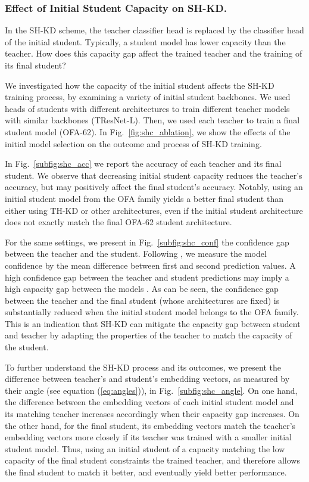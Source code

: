 \subsubsection{Effect of Initial Student Capacity on SH-KD.} 
In the SH-KD scheme, the teacher classifier head is replaced by the classifier head of the initial student.
Typically, a student model has lower capacity than the teacher. How does this capacity gap affect the trained teacher and the training of its final student?

We investigated how the capacity of the initial student affects the SH-KD training process, by examining a variety of initial student backbones. We used heads of students with different architectures to train different teacher models with similar backbones (TResNet-L). Then, we used each teacher to train a final student model (OFA-62). In Fig.~\ref{fig:shc_ablation}, we show the effects of the initial model selection on the outcome and process of SH-KD training. 

In Fig.~\ref{subfig:shc_acc} we report the accuracy of each teacher and its final student. We observe that decreasing initial student capacity reduces the teacher's accuracy, but may positively affect the final student's accuracy. Notably, using an initial student model from the OFA family yields a better final student than either using TH-KD or other architectures, even if the initial student architecture does not exactly match the final OFA-62 student architecture.


For the same settings, we present in Fig.~\ref{subfig:shc_conf} the confidence gap between the teacher and the student. Following \cite{xu2020computationefficient}, we measure the model confidence by the mean difference between first and second prediction values. A high confidence gap between the teacher and student predictions may imply a high capacity gap between the models \cite{guo2021reducing}.
As can be seen, the confidence gap between the teacher and the final student (whose architectures are fixed) is substantially reduced when the initial student model belongs to the OFA family. This is an indication that SH-KD can mitigate the capacity gap between student and teacher by adapting the properties of the teacher to match the capacity of the student.


To further understand the SH-KD process and its outcomes, we present the difference between teacher's and student's embedding vectors, as measured by their angle (see equation (\ref{eq:angles})), in Fig.~\ref{subfig:shc_angle}. On one hand, the difference between the embedding vectors of each initial student model and its matching teacher increases accordingly when their capacity gap increases. On the other hand, for the final student, its embedding vectors match the teacher's embedding vectors more closely if its teacher was trained with a smaller initial student model. Thus, using an initial student of a capacity matching the low capacity of the final student constraints the trained teacher, and therefore allows the final student to match it better, and eventually yield better performance.



